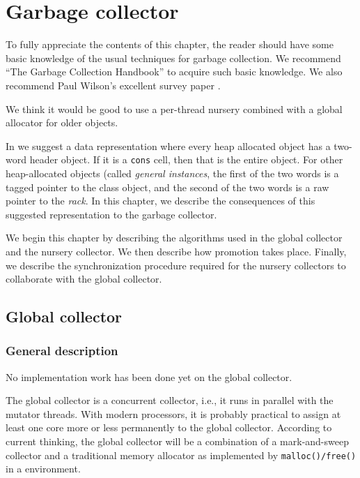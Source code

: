 \chapter{Garbage collector}

To fully appreciate the contents of this chapter, the reader should
have some basic knowledge of the usual techniques for garbage
collection.  We recommend ``The Garbage Collection Handbook''
\cite{Jones:2011:GCH:2025255} to acquire such basic knowledge.  We
also recommend Paul Wilson's excellent survey paper
\cite{Wilson:1992:UGC:645648.664824}.

We think it would be good to use a per-thread nursery combined with a
global allocator for older objects.

In  we suggest a data representation
where every heap allocated object has a two-word header object.  If it
is a \texttt{cons} cell, then that is the entire object.  For other
heap-allocated objects (called \emph{general instances}, the first of
the two words is a tagged pointer to the class object, and the second
of the two words is a raw pointer to the \emph{rack}.  In
this chapter, we describe the consequences of this suggested
representation to the garbage collector.

We begin this chapter by describing the algorithms used in the global
collector and the nursery collector.  We then describe how promotion
takes place.  Finally, we describe the synchronization procedure
required for the nursery collectors to collaborate with the global
collector.

\section{Global collector}
\subsection{General description}

No implementation work has been done yet on the global collector.

The global collector is a concurrent collector, i.e., it runs in
parallel with the mutator threads.  With modern processors, it is
probably practical to assign at least one core more or less
permanently to the global collector.  According to current thinking,
the global collector will be a combination of a mark-and-sweep
collector and a  traditional memory allocator as implemented by
\texttt{malloc()/free()} in a \clanguage{} environment.

